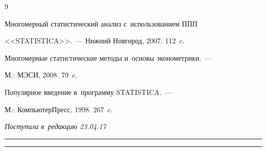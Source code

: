 {{\begin{thebibliography}{9}

 Многомерный статистический анализ с~использованием ППП 

<<\mbox{STATISTICA}>>.~--- Нижний Новгород, 2007. 112~c.


 Многомерные статистические методы и~основы эконометрики.~--- 

М.: МЭСИ, 2008. 79~c.


 Популярное введение в~программу STATISTICA.~--- 

М.: КомпьютерПресс, 1998. 267~c.

        \end{thebibliography}

} }





\vspace*{-6pt}



\hfill{\small\textit{Поступила в~редакцию 23.04.17}}









\vspace*{4pt}



\hrule



\vspace*{2pt}









\hrule










\def\tit{PREDICTION OF LATE POSTOPERATIVE COMPLICATIONS BASED ON~THE~RESULTS 

OF~DISCRIMINANT AND~CORRELATION ANALYSES 

OF~THE~EARLY POSTOPERATIVE GLYCEMIA CHARACTERISTICS}



